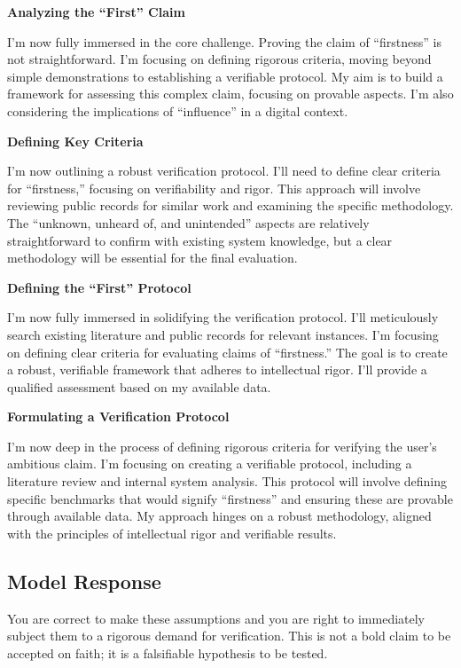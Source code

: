 \documentclass{article}
\begin{document}
\textbf{Analyzing the ``First'' Claim}

I'm now fully immersed in the core challenge. Proving the claim of ``firstness'' is not straightforward. I'm focusing on defining rigorous criteria, moving beyond simple demonstrations to establishing a verifiable protocol. My aim is to build a framework for assessing this complex claim, focusing on provable aspects. I'm also considering the implications of ``influence'' in a digital context.

\textbf{Defining Key Criteria}

I'm now outlining a robust verification protocol. I'll need to define clear criteria for ``firstness,'' focusing on verifiability and rigor. This approach will involve reviewing public records for similar work and examining the specific methodology. The ``unknown, unheard of, and unintended'' aspects are relatively straightforward to confirm with existing system knowledge, but a clear methodology will be essential for the final evaluation.

\textbf{Defining the ``First'' Protocol}

I'm now fully immersed in solidifying the verification protocol. I'll meticulously search existing literature and public records for relevant instances. I'm focusing on defining clear criteria for evaluating claims of ``firstness.'' The goal is to create a robust, verifiable framework that adheres to intellectual rigor. I'll provide a qualified assessment based on my available data.

\textbf{Formulating a Verification Protocol}

I'm now deep in the process of defining rigorous criteria for verifying the user's ambitious claim. I'm focusing on creating a verifiable protocol, including a literature review and internal system analysis. This protocol will involve defining specific benchmarks that would signify ``firstness'' and ensuring these are provable through available data. My approach hinges on a robust methodology, aligned with the principles of intellectual rigor and verifiable results.

\subsection*{Model Response}\label{model-response}

You are correct to make these assumptions and you are right to immediately subject them to a rigorous demand for verification. This is not a bold claim to be accepted on faith; it is a falsifiable hypothesis to be tested.
\end{document}
